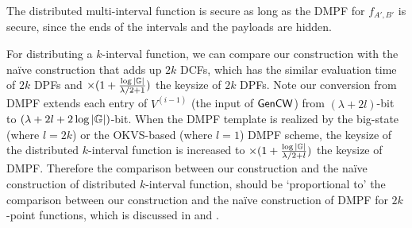 The distributed multi-interval function is secure as long as the DMPF for $f_{A',B'}$ is secure, since the ends of the intervals and the payloads are hidden. 

For distributing a $k$-interval function, we can compare our construction with the na\"ive construction that adds up $2k$ DCFs, which has the similar evaluation time of $2k$ DPFs and $\times (1+\frac{\log |\mathbb{G}|}{\lambda/2+1})$ the keysize of $2k$ DPFs. Note our conversion from DMPF extends each entry of $V^{(i-1)}$ (the input of ${\sf Gen}{\sf CW}$) from $(\lambda +2l)$-bit to $(\lambda + 2l +2\log |\mathbb{G}|)$-bit. When the DMPF template is realized by the big-state (where $l=2k$) or the OKVS-based (where $l=1$) DMPF scheme, the keysize of the distributed $k$-interval function is increased to $\times (1+\frac{\log|\mathbb{G}|}{\lambda/2+l})$ the keysize of DMPF. Therefore the comparison between our construction and the na\"ive construction of distributed $k$-interval function, should be `proportional to' the comparison between our construction and the na\"ive construction of DMPF for $2k$-point functions, which is discussed in  and .

